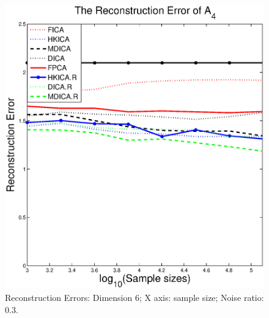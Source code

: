 \begin{figure}[t]
	\includegraphics[width =0.45\columnwidth]{error4_sample_noise3}
\caption{
\label{fig:Error_sample_noise3}
 Reconstruction Errors: Dimension 6; X axis: sample size; Noise ratio: 0.3.}
\end{figure}

